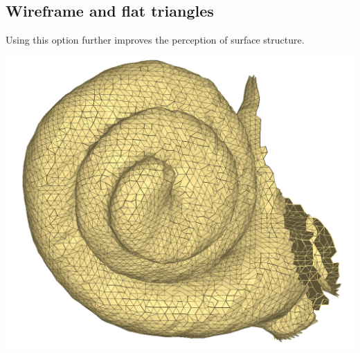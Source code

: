 \noindent
\begin{minipage}{0.55\textwidth}

\subsection{Wireframe and flat triangles}
Using this option further improves the perception of surface structure.

\end{minipage}  
 \begin{minipage}{0.45\textwidth}\centering


\includegraphics[scale=0.1]{images/Viewing_options/Triangle_flat_triangles.png}

 \end{minipage} 
\noindent




